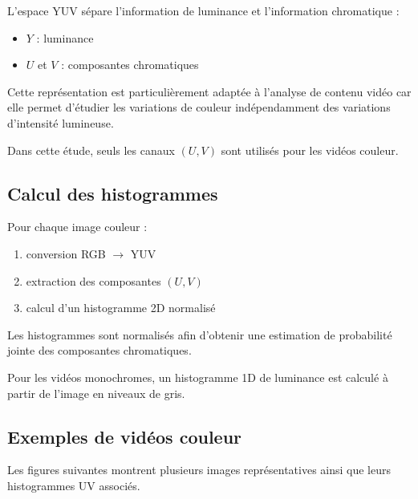 \documentclass[11pt,a4paper]{article}
\begin{document}
    L’espace YUV sépare l’information de luminance et l’information chromatique :
    
    \begin{itemize}
        \item $Y$ : luminance
        \item $U$ et $V$ : composantes chromatiques
    \end{itemize}
    
    Cette représentation est particulièrement adaptée à l’analyse de contenu vidéo car elle permet d’étudier les variations de couleur indépendamment des variations d’intensité lumineuse.
    
    Dans cette étude, seuls les canaux $(U,V)$ sont utilisés pour les vidéos couleur.
    
    
    \subsection*{Calcul des histogrammes}
    
    Pour chaque image couleur :
    
    \begin{enumerate}
        \item conversion RGB $\rightarrow$ YUV
        \item extraction des composantes $(U,V)$
        \item calcul d’un histogramme 2D normalisé
    \end{enumerate}
    
    Les histogrammes sont normalisés afin d’obtenir une estimation de probabilité jointe des composantes chromatiques.
    
    Pour les vidéos monochromes, un histogramme 1D de luminance est calculé à partir de l’image en niveaux de gris.
    
    
    \subsection*{Exemples de vidéos couleur}
    
    Les figures suivantes montrent plusieurs images représentatives ainsi que leurs histogrammes UV associés.
    
\end{document}
